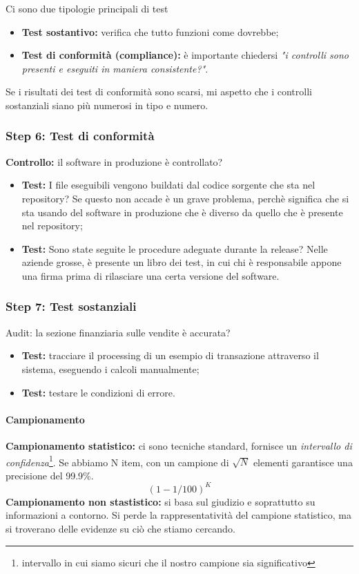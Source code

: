 Ci sono due tipologie principali di test
\begin{itemize}
\item \textbf{Test sostantivo:} verifica che tutto funzioni come dovrebbe;
\item \textbf{Test di conformità (compliance):} è importante chiedersi  \textit{"i controlli 
sono presenti e eseguiti in maniera consistente?"}.
\end{itemize}

Se i risultati dei test di conformità sono scarsi, mi aspetto che i controlli 
sostanziali siano più numerosi in tipo e numero.

\subsubsection{Step 6: Test di conformità}

\textbf{Controllo:} il software in produzione è controllato?
\begin{itemize}
\item \textbf{Test:} I file eseguibili vengono buildati dal codice sorgente che sta nel 
repository? Se questo non accade è un grave problema, perchè significa che si 
sta usando del software in produzione che è diverso da quello che è presente 
nel repository;
\item \textbf{Test:} Sono state seguite le procedure adeguate durante la release? Nelle 
aziende grosse, è presente un libro dei test, in cui chi è responsabile appone 
una firma prima di rilasciare una certa versione del software.
\end{itemize}


\subsubsection{Step 7: Test sostanziali}

Audit: la sezione finanziaria sulle vendite è accurata? 

\begin{itemize}
\item \textbf{Test:} tracciare il processing di un esempio di transazione attraverso il 
sistema, eseguendo i calcoli manualmente;
\item \textbf{Test:} testare le condizioni di errore.
\end{itemize}


\paragraph{Campionamento}

\textbf{Campionamento statistico:} ci sono tecniche standard, fornisce un 
\textit{intervallo di confidenza}\footnote{intervallo in cui siamo sicuri che il nostro 
campione sia significativo}. Se abbiamo N item, con un campione di $\sqrt{N}$ 
elementi garantisce una precisione del 99.9\%.
$$
(1 - 1/100)^K
$$
\newline
\textbf{Campionamento non stastistico:} si basa sul giudizio e soprattutto su 
informazioni a contorno. Si perde la rappresentatività del campione statistico, 
ma si troverano delle evidenze su ciò che stiamo cercando.
